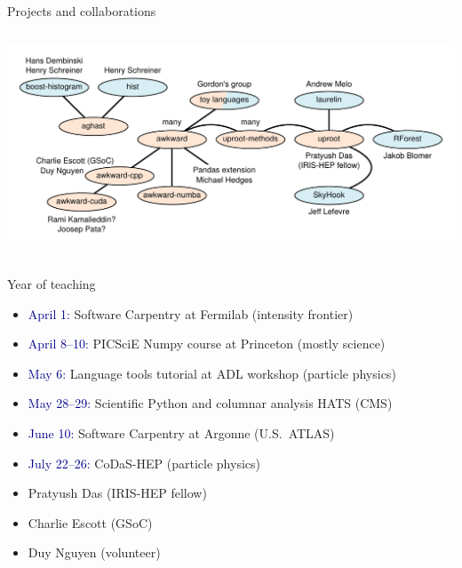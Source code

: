 \documentclass[aspectratio=169]{beamer}
\begin{document}
\begin{frame}{Projects and collaborations}
\vspace{0.5 cm}
\begin{columns}
\includegraphics[width=\linewidth]{projects.pdf}
\end{columns}
\end{frame}

\begin{frame}{Year of teaching}
\vspace{0.5 cm}
\large

\begin{itemize}\setlength{\itemsep}{0.25 cm}
\item \textcolor{darkblue}{April 1:}     \tabto{2.3 cm}Software Carpentry at Fermilab (intensity frontier)
\item \textcolor{darkblue}{April 8--10:} \tabto{2.3 cm}PICSciE Numpy course at Princeton (mostly science)
\item \textcolor{darkblue}{May 6:}       \tabto{2.3 cm}Language tools tutorial at ADL workshop (particle physics)
\item \textcolor{darkblue}{May 28--29:}  \tabto{2.3 cm}Scientific Python and columnar analysis HATS (CMS)
\item \textcolor{darkblue}{June 10:}     \tabto{2.3 cm}Software Carpentry at Argonne (U.S.\ ATLAS)
\item \textcolor{darkblue}{July 22--26:} \tabto{2.3 cm}CoDaS-HEP (particle physics)
\end{itemize}

\vspace{0.5 cm}
\begin{itemize}
\item Pratyush Das (IRIS-HEP fellow)
\item Charlie Escott (GSoC)
\item Duy Nguyen (volunteer)
\end{itemize}
\end{frame}
\end{document}

